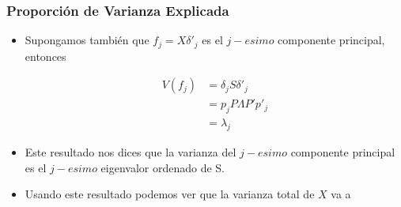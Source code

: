 \documentclass[
  shownotes,
  xcolor={svgnames},
  hyperref={colorlinks,citecolor=DarkBlue,linkcolor=DarkRed,urlcolor=DarkBlue}
  , aspectratio=169]{beamer}
\begin{document}
\begin{frame}
\frametitle{Proporción de Varianza Explicada}

\begin{itemize}
\item  Supongamos también que \(f_j= X \delta'_j\) es el \(j-esimo\)  componente principal, entonces

\begin{align}
V (f_j ) &= \delta_j S \delta'_j  \\\
         &= p_j P\Lambda P' p'_j  \\\
         &= \lambda_j
\end{align}



\item Este resultado nos dices que la varianza del \(j-esimo\) componente  principal es el \(j-esimo\) eigenvalor ordenado de S.

\item  Usando este resultado podemos ver que la varianza total de \(X\) va a


\end{itemize}
\end{frame}
\end{document}
